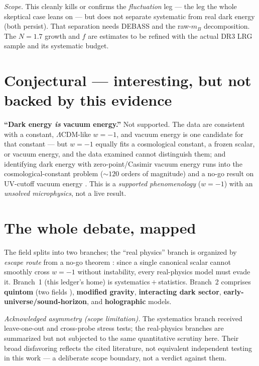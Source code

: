 \documentclass[11pt]{article}
\newcommand{\LCDM}{$\Lambda$CDM}
\begin{document}
\begin{caveatbox}
\textit{Scope.} This cleanly kills or confirms the \emph{fluctuation} leg --- the leg the whole skeptical case leans on --- but does not separate systematic from real dark energy (both persist). That separation needs DEBASS and the raw-$m_B$ decomposition. The $N=1.7$ growth and $f$ are estimates to be refined with the actual DR3 LRG sample and its systematic budget.
\end{caveatbox}

\section{Conjectural --- interesting, but not backed by this evidence}

\textbf{``Dark energy \emph{is} vacuum energy.''} Not supported. The data are consistent with a constant, \LCDM-like $w=-1$, and vacuum energy is one candidate for that constant --- but $w=-1$ equally fits a cosmological constant, a frozen scalar, or vacuum energy, and the data examined cannot distinguish them; and identifying dark energy with zero-point/Casimir vacuum energy runs into the cosmological-constant problem ($\sim\!120$ orders of magnitude) and a no-go result on UV-cutoff vacuum energy \cite{peri}. This is a \emph{supported phenomenology} ($w=-1$) with an \emph{unsolved microphysics}, not a live result.

\section{The whole debate, mapped}

The field splits into two branches; the ``real physics'' branch is organized by \emph{escape route} from a no-go theorem \cite{vikman}: since a single canonical scalar cannot smoothly cross $w=-1$ without instability, every real-physics model must evade it. Branch~1 (this ledger's home) is systematics${}+{}$statistics. Branch~2 comprises \textbf{quintom} (two fields \cite{quintom}), \textbf{modified gravity}, \textbf{interacting dark sector}, \textbf{early-universe/sound-horizon}, and \textbf{holographic} models.

\begin{caveatbox}
\textit{Acknowledged asymmetry (scope limitation).} The systematics branch received leave-one-out and cross-probe stress tests; the real-physics branches are summarized but not subjected to the same quantitative scrutiny here. Their broad disfavoring reflects the cited literature, not equivalent independent testing in this work --- a deliberate scope boundary, not a verdict against them.
\end{caveatbox}
\end{document}
